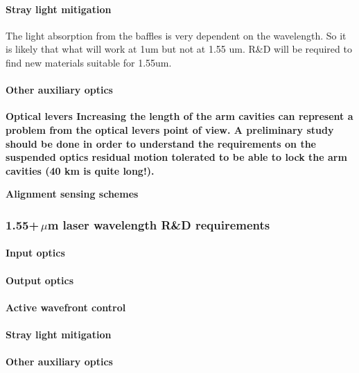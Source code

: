 \paragraph{Stray light mitigation}
The light absorption from the baffles is very dependent on the wavelength. So it is likely that what will work at 1um but not at 1.55 um. R\&D will be required to find new materials suitable for 1.55um.  

\paragraph{Other auxiliary optics}
\bf{Optical levers}
Increasing the length of the arm cavities can represent a problem from the optical levers point of view. A preliminary study should be done in order to understand the requirements on the suspended optics residual motion tolerated to be able to lock the arm cavities (40 km is quite long!).

\bf{Alignment sensing schemes}


\subsubsection{1.55+\,$\mu$m laser wavelength R\&D requirements}
\paragraph{Input optics}
\paragraph{Output optics}
\paragraph{Active wavefront control}
\paragraph{Stray light mitigation}
\paragraph{Other auxiliary optics}

